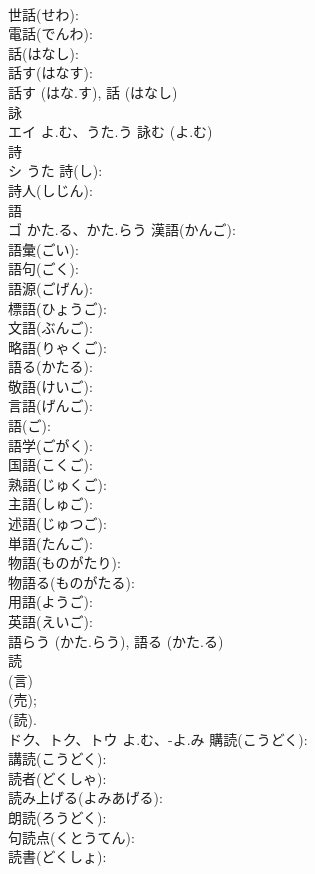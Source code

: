 \documentclass[8pt]{extreport}
\begin{document}
\begin{CJK}{UTF8}{min}
\\	世話(せわ): 
\\	電話(でんわ): 
\\	話(はなし): 
\\	話す(はなす): 
\\	話す (はな.す), 話 (はなし)
\\	詠			
\\	エイ	よ.む、うた.う		詠む (よ.む)
\\	詩			
\\	シ	うた	詩(し): 
\\	詩人(しじん): 
\\	語			
\\	ゴ	かた.る、かた.らう	漢語(かんご): 
\\	語彙(ごい): 
\\	語句(ごく): 
\\	語源(ごげん): 
\\	標語(ひょうご): 
\\	文語(ぶんご): 
\\	略語(りゃくご): 
\\	語る(かたる): 
\\	敬語(けいご): 
\\	言語(げんご): 
\\	語(ご): 
\\	語学(ごがく): 
\\	国語(こくご): 
\\	熟語(じゅくご): 
\\	主語(しゅご): 
\\	述語(じゅつご): 
\\	単語(たんご): 
\\	物語(ものがたり): 
\\	物語る(ものがたる): 
\\	用語(ようご): 
\\	英語(えいご): 
\\	語らう (かた.らう), 語る (かた.る)
\\	読			
\\	(言) 
\\	(売); 
\\	(読).	
\\	ドク、トク、トウ	よ.む、-よ.み	購読(こうどく): 
\\	講読(こうどく): 
\\	読者(どくしゃ): 
\\	読み上げる(よみあげる): 
\\	朗読(ろうどく): 
\\	句読点(くとうてん): 
\\	読書(どくしょ): 

\end{CJK}
\end{document}
